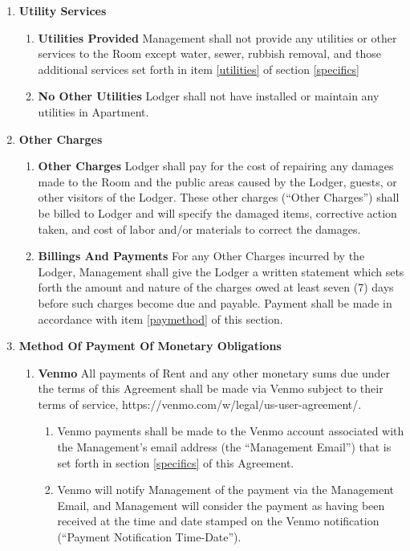 \documentclass[12pt,letterpaper]{article}
\newcommand{\lodger}{Lodger}
\newcommand{\management}{Management}
\newcommand{\myemail}{Management Email}
\newcommand{\apt}{Apartment}
\newcommand{\room}{Room}
\newcommand{\paymenttime}{Payment Notification Time-Date}
\begin{document}
\begin{enumerate}
\begin{enumerate}
		\end{enumerate} 
	\item \textbf{Utility Services} \quad 
		\begin{enumerate} 
			\item \textbf{Utilities Provided} \quad \management{} shall not provide any utilities or other services to the \room{} except water, sewer, rubbish removal, and those additional services set forth in item \ref{utilities} of section \ref{specifics}
			\item \textbf{No Other Utilities} \quad \lodger{} shall not have installed or maintain any utilities in \apt{}.
		\end{enumerate} 
	\item \textbf{Other Charges} \quad 
		\begin{enumerate} 
			\item \textbf{Other Charges} \quad \lodger{} shall pay for the cost of repairing any damages made to the \room{} and the public areas caused by the \lodger{}, guests, or other visitors of the \lodger{}. These other charges (``Other Charges'') shall be billed to \lodger{} and will specify the damaged items, corrective action taken, and cost of labor and/or materials to correct the damages. 
			\item \textbf{Billings And Payments} \quad For any Other Charges incurred by the \lodger{}, \management{} shall give the \lodger{} a written statement which sets forth the amount and nature of the charges owed at least seven (7) days before such charges become due and payable. Payment shall be made in accordance with item \ref{paymethod} of this section. 
		\end{enumerate} 
	\item \textbf{Method Of Payment Of Monetary Obligations} \quad \label{paymethod}
		\begin{enumerate} 
			\item \textbf{Venmo} \quad All payments of Rent and any other monetary sums due under the terms of this Agreement shall be made via Venmo subject to their terms of service, https://venmo.com/w/legal/us-user-agreement/. 
				\begin{enumerate}
					\item Venmo payments shall be made to the Venmo account associated with the \management{}'s email address (the ``\myemail{}'') that is set forth in section \ref{specifics} of this Agreement{}. 
					\item \label{defpaytime} 
						Venmo will notify \management{} of the payment via the \myemail{}, and \management{} will consider the payment as having been received at the time and date stamped on the Venmo notification (``\paymenttime{}''). 

\end{enumerate}
\end{enumerate}
\end{enumerate}
\end{document}
